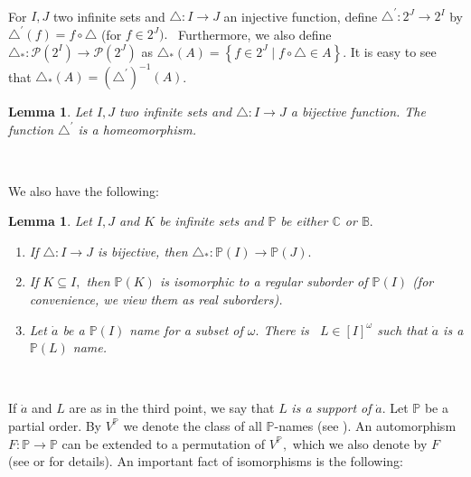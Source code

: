 \documentclass{article}%
\newtheorem{lemma}[theorem]{Lemma}
\begin{document}
\qquad\ \ \ \ \qquad\ \ \ \ \ \ \ \ 

For $I,J$ two infinite sets and $\triangle:I\longrightarrow J$ an injective
function, define $\triangle^{\prime}:2^{J}\longrightarrow2^{I}$ by
$\triangle^{\prime}\left(  f\right)  =f\circ\triangle$ (for $f\in2^{J}).$
\ Furthermore, we also define $\triangle_{\ast}:\mathcal{P}\left(
2^{I}\right)  \longrightarrow\mathcal{P}\left(  2^{J}\right)  $ as
$\triangle_{\ast}\left(  A\right)  =\left\{  f\in2^{J}\mid f\circ\triangle\in
A\right\}  .$ It is easy to see that $\triangle_{\ast}\left(  A\right)
=\left(  \triangle^{\prime}\right)  ^{-1}\left(  A\right)  $.

\begin{lemma}
Let $I,J$ two infinite sets and $\triangle:I\longrightarrow J$ a bijective
function. The function $\triangle^{\prime}$ is a homeomorphism.
\end{lemma}

\qquad\ \qquad\ \ \ 

We also have the following:

\begin{lemma}
Let $I,J$ and $K$ be infinite sets and $\mathbb{P}$ be either $\mathbb{C}$ or
$\mathbb{B}.$

\begin{enumerate}
\item If $\triangle:I\longrightarrow J$ is bijective, then $\triangle_{\ast
}:\mathbb{P}\left(  I\right)  \longrightarrow\mathbb{P}\left(  J\right)  .$

\item If $K\subseteq I,$ then $\mathbb{P}\left(  K\right)  $ is isomorphic to
a regular suborder of $\mathbb{P}\left(  I\right)  $ (for convenience, we view
them as real suborders).

\item Let $\dot{a}$ be a $\mathbb{P}\left(  I\right)  $ name for a subset of
$\omega.$ There is \ $L\in\left[  I\right]  ^{\omega}$ such that $\dot{a}$ is
a $\mathbb{P}\left(  L\right)  $ name.
\end{enumerate}
\end{lemma}

\qquad\ \ \ \ \ 

If $\dot{a}$ and $L$ are as in the third point, we say that $L$\emph{ is a
support of }$\dot{a}.$ Let $\mathbb{P}$ be a partial order. By $V^{\mathbb{P}%
}$ we denote the class of all $\mathbb{P}$-names (see \cite{oldKunen}). An
automorphism $F:\mathbb{P\longrightarrow P}$ can be extended to a permutation
of $V^{\mathbb{P}},$ which we also denote by $F$ (see \cite{Jech} or
\cite{JechAC} for details). An important fact of isomorphisms is the following:
\end{document}
